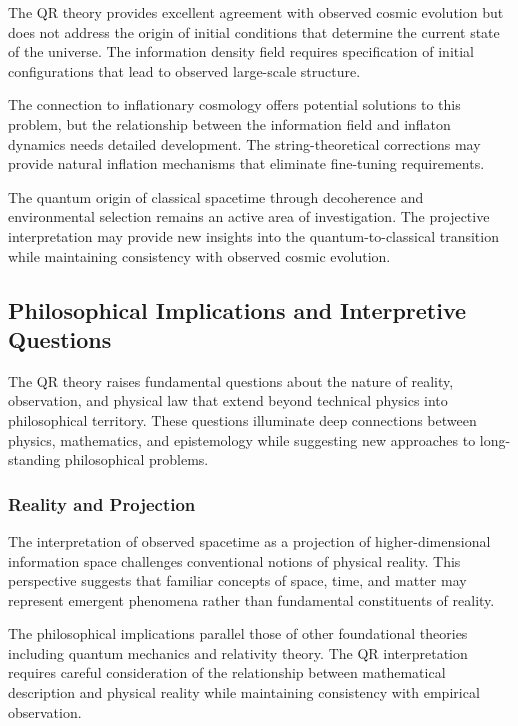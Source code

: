 The QR theory provides excellent agreement with observed cosmic evolution but does not address the origin of initial conditions that determine the current state of the universe. The information density field requires specification of initial configurations that lead to observed large-scale structure.

The connection to inflationary cosmology offers potential solutions to this problem, but the relationship between the information field and inflaton dynamics needs detailed development. The string-theoretical corrections may provide natural inflation mechanisms that eliminate fine-tuning requirements.

The quantum origin of classical spacetime through decoherence and environmental selection remains an active area of investigation. The projective interpretation may provide new insights into the quantum-to-classical transition while maintaining consistency with observed cosmic evolution.

\subsection{Philosophical Implications and Interpretive Questions}
\label{subsec:philosophical-implications}

The QR theory raises fundamental questions about the nature of reality, observation, and physical law that extend beyond technical physics into philosophical territory. These questions illuminate deep connections between physics, mathematics, and epistemology while suggesting new approaches to long-standing philosophical problems.

\subsubsection{Reality and Projection}
\label{subsubsec:reality-projection}

The interpretation of observed spacetime as a projection of higher-dimensional information space challenges conventional notions of physical reality. This perspective suggests that familiar concepts of space, time, and matter may represent emergent phenomena rather than fundamental constituents of reality.

The philosophical implications parallel those of other foundational theories including quantum mechanics and relativity theory. The QR interpretation requires careful consideration of the relationship between mathematical description and physical reality while maintaining consistency with empirical observation.


